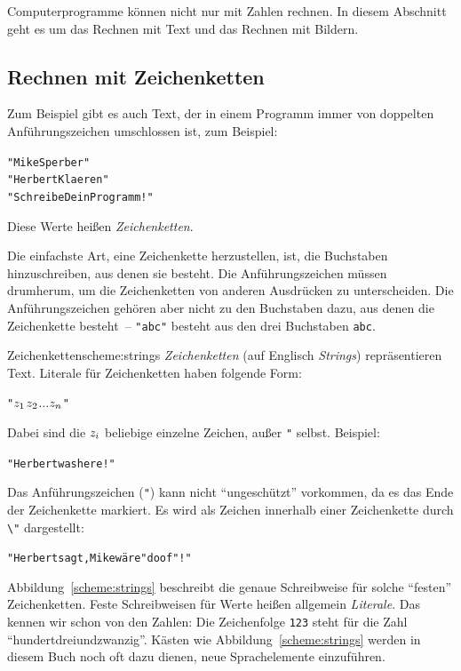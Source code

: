 Computerprogramme können nicht nur mit Zahlen rechnen.  In diesem
Abschnitt geht es um das Rechnen mit Text und das Rechnen mit Bildern.

\subsection{Rechnen mit Zeichenketten}

Zum Beispiel gibt es auch Text, der in einem Programm immer von
doppelten Anführungszeichen umschlossen ist, zum Beispiel:
%
\begin{alltt}
"Mike Sperber"
"Herbert Klaeren"
"Schreibe Dein Programm!"
\end{alltt}
%
Diese Werte heißen \textit{Zeichenketten}.

Die einfachste Art, eine Zeichenkette herzustellen, ist, die
Buchstaben hinzuschreiben, aus denen sie besteht.  Die
Anführungszeichen müssen drumherum, um die Zeichenketten von anderen
Ausdrücken zu unterscheiden.  Die Anführungszeichen gehören aber nicht
zu den Buchstaben dazu, aus denen die Zeichenkette besteht~--
\verb|"abc"| besteht aus den drei Buchstaben \texttt{abc}.

\begin{feature}{Zeichenketten}{scheme:strings}
\textit{Zeichenketten} (auf Englisch
\textit{Strings}) repräsentieren Text.
Literale für Zeichenketten haben folgende Form:
%
\begin{alltt}
"\(z\sb{1}\)\(z\sb{2}\) \(\ldots\) \(z\sb{n}\)"
\end{alltt}
%
Dabei sind die \(z\sb{i}\) beliebige einzelne Zeichen, außer \verb|"| selbst.
Beispiel:
%
\begin{alltt}
"Herbert was here!"
\end{alltt}
%
Das Anführungszeichen (\verb|"|) kann nicht "`ungeschützt"' vorkommen, da es das Ende der
Zeichenkette markiert. Es wird als Zeichen innerhalb einer Zeichenkette
durch \verb|\"| dargestellt:
%
\begin{alltt}
"Herbert sagt, Mike wäre \backwhack{}"doof\backwhack{}"!"
\end{alltt}
\end{feature}

Abbildung~\ref{scheme:strings} beschreibt die genaue Schreibweise für
solche "`festen"' Zeichenketten.  Feste Schreibweisen für Werte heißen
allgemein \textit{Literale}.  Das kennen wir schon von
den Zahlen: Die Zeichenfolge \texttt{123} steht für die Zahl
"`hundertdreiundzwanzig"'.  Kästen wie Abbildung~\ref{scheme:strings}
werden in diesem Buch noch oft dazu dienen, neue Sprachelemente
einzuführen.

